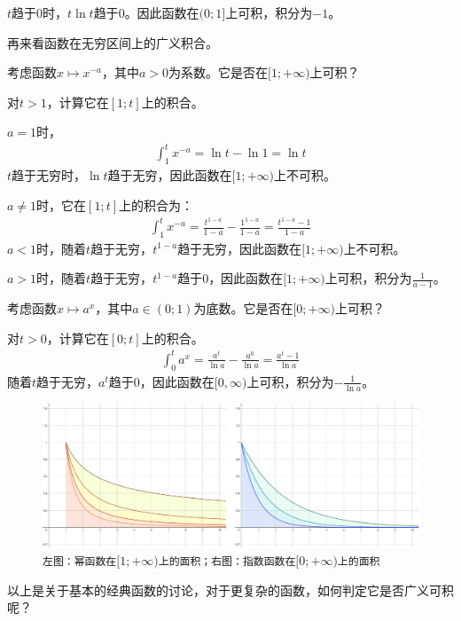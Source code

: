 \documentclass[12pt,UTF8]{ctexbook}
\begin{document}
$t$趋于$0$时，$t\ln{t}$趋于$0$。因此函数在$(0;1]$上可积，积分为$-1$。

再来看函数在无穷区间上的广义积合。

考虑函数$x\mapsto x^{-a}$，其中$a>0$为系数。它是否在$[1;+\infty)$上可积？

对$t>1$，计算它在$[1;t]$上的积合。

$a=1$时，
\begin{align*}
    \int_1^t x^{-a} = \ln{t} - \ln{1} = \ln{t} 
\end{align*}
$t$趋于无穷时，$\ln{t}$趋于无穷，因此函数在$[1;+\infty)$上不可积。

$a\neq 1$时，它在$[1;t]$上的积合为：
\begin{align*}
    \int_1^t x^{-a} = \frac{t^{1-a}}{1 - a} - \frac{1^{1-a}}{1 - a} = \frac{t^{1-a} - 1}{1-a} 
\end{align*}
$a<1$时，随着$t$趋于无穷，$t^{1-a}$趋于无穷，因此函数在$[1;+\infty)$上不可积。

$a>1$时，随着$t$趋于无穷，$t^{1-a}$趋于$0$，因此函数在$[1;+\infty)$上可积，积分为$\frac{1}{a-1}$。

考虑函数$x\mapsto a^x$，其中$a\in(0;1)$为底数。它是否在$[0;+\infty)$上可积？

对$t>0$，计算它在$[0;t]$上的积合。
\begin{align*}
    \int_0^t a^x = \frac{a^t}{\ln{a}} - \frac{a^0}{\ln{a}} = \frac{a^t - 1}{\ln{a}}
\end{align*}
随着$t$趋于无穷，$a^t$趋于$0$，因此函数在$[0,\infty)$上可积，积分为$-\frac{1}{\ln{a}}$。

\begin{figure}[h] %
    \vspace{4pt}
    \centering
    \includegraphics[width=\textwidth]{tu/广义积分2.png}
    \caption*{\texttt{左图：幂函数在}$[1;+\infty)$\texttt{上的面积；右图：指数函数在}$[0;+\infty)$\texttt{上的面积}}
\end{figure}

以上是关于基本的经典函数的讨论，对于更复杂的函数，如何判定它是否广义可积呢？
\end{document}
